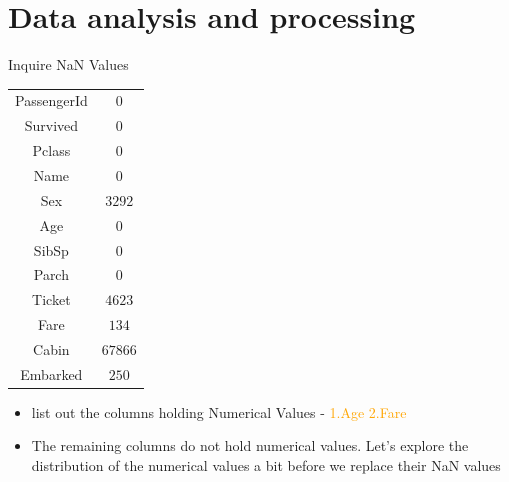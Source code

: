 \documentclass[
size=14pt,
paper=smartboard,  %
mode=present, 		%
display=slides, 	%
style=tuliplab,  	%
pauseslide,
fleqn,leqno]{powerdot}
\begin{document}
	
	\section{Data analysis and processing}
	
	
	\begin{slide}{Inquire NaN Values}
		\begin{center}	\begin{tabular}{c|c}
				\toprule
				\midrule
				{PassengerId}
				&  {$0$} \\
				{Survived}
				&  {$0$} \\
				{Pclass}
				&  {$0$} \\
				{Name}
				&  {$0$} \\
				{Sex}
				&  {$3292$} \\
				{Age}
				&  {$0$} \\
				{SibSp}
				&  {$0$} \\
				{Parch}
				&  {$0$} \\
				{Ticket}
				&  {$4623$} \\
				{Fare}
				&  {$134$} \\
				{Cabin}
				&  {$67866$} \\
				{Embarked}
				&  {$250$} \\
				\bottomrule
			\end{tabular}
		\end{center}
		\vspace{-0.6cm}
		\begin{itemize}
			\item
			list out the columns holding Numerical Values - \textcolor{orange}{1.Age  2.Fare}
			\item
			The remaining columns do not hold numerical values. Let's explore the distribution of the numerical values a bit before we replace their NaN values
		\end{itemize}
	\end{slide}
	
\end{document}
